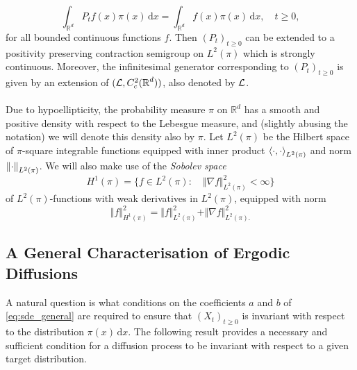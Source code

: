 \begin{equation*}
	\int_{\mathbb{R}^d} P_t f(x)\pi(x)\,\mathrm{d}x = \int_{\mathbb{R}^d} f(x)\pi(x)\,\mathrm{d}x,\quad t \geq 0,
\end{equation*}
for all bounded continuous functions $f$. Then $(P_t)_{t\ge0}$ can be extended to a positivity preserving contraction semigroup on $L^2(\pi)$ which is strongly continuous.   Moreover, the infinitesimal generator corresponding to $(P_t)_{t\ge0}$ is given by an extension of $(\operatorname{\mathcal{L}}, C^{2}_c(\operatorname{\mathbb{R}}^d))$, also denoted by $\operatorname{\mathcal{L}}$.
\\\\
Due to hypoellipticity, the probability measure $\pi$ on $\mathbb{R}^d$ has a smooth and positive density with respect to the Lebesgue measure, and (slightly abusing the notation) we will denote this density also by $\pi$. Let $L^2(\pi)$ be the Hilbert space of $\pi$-square integrable functions equipped with inner product $\left\langle \cdot, \cdot \right\rangle_{L^2(\pi)}$ and norm $\left\lVert{\cdot}\right\rVert_{L^2(\pi)}$. We will also make use of the \emph{Sobolev space} 
\begin{equation}
H^1(\pi)=\{f \in L^2(\pi):\quad \Vert\nabla f\Vert^2_{L^2(\pi)}<\infty\}
\end{equation} of $L^2(\pi)$-functions with weak derivatives in $L^2(\pi)$, equipped with norm
\begin{equation*}
\Vert f \Vert ^2_{H^1(\pi)} = \Vert f \Vert ^2_{L^2(\pi)} + \Vert \nabla f \Vert ^2_{L^2(\pi).}
\end{equation*}

\subsection{A General Characterisation of Ergodic Diffusions}
\label{sec:characterisation}

A natural question is what conditions on the coefficients $a$ and $b$ of \eqref{eq:sde_general} are required to ensure that $(X_t)_{t\ge0}$ is invariant with respect to the distribution $\pi(x)\,\mathrm{d}x$.    The following result provides a necessary and sufficient condition for a diffusion process to be invariant with respect to a given target distribution.

